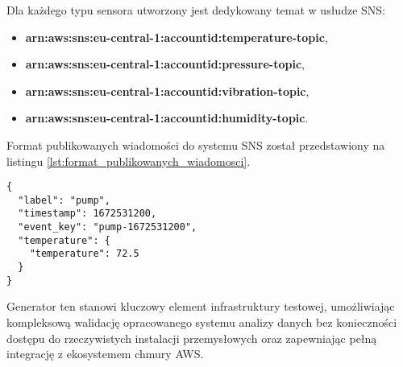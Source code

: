 Dla każdego typu sensora utworzony jest dedykowany temat w usłudze SNS:

\begin{itemize}
    \item \textbf{arn:aws:sns:eu-central-1:accountid:temperature-topic},
    \item \textbf{arn:aws:sns:eu-central-1:accountid:pressure-topic},
    \item \textbf{arn:aws:sns:eu-central-1:accountid:vibration-topic},
    \item \textbf{arn:aws:sns:eu-central-1:accountid:humidity-topic}.
\end{itemize}

\newpage

Format publikowanych wiadomości do systemu SNS został przedstawiony na listingu \ref{lst:format_publikowanych_wiadomosci}.

\begin{lstlisting}[caption=Format publikowanych wiadomości, label={lst:format_publikowanych_wiadomosci}]
{
  "label": "pump",
  "timestamp": 1672531200,
  "event_key": "pump-1672531200",
  "temperature": {
    "temperature": 72.5
  }
}
\end{lstlisting}


Generator ten stanowi kluczowy element infrastruktury testowej, umożliwiając kompleksową walidację opracowanego systemu analizy danych bez konieczności dostępu do rzeczywistych instalacji przemysłowych oraz zapewniając pełną integrację z ekosystemem chmury AWS.